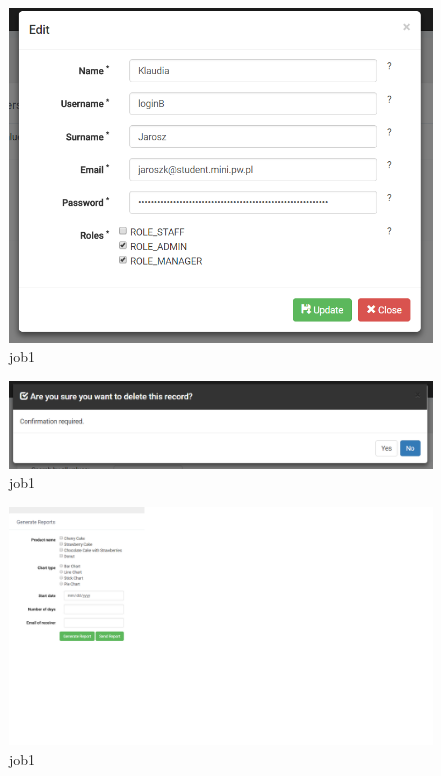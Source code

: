 \documentclass[a4paper,11pt,twoside]{report}
\theoremstyle{definition}
\begin{document}
\begin{figure}[h!]
\begin{center}
\includegraphics[width=\textwidth]{AS/users/4}
\end{center}
\caption{job1}
\end{figure}
\thispagestyle{empty}


\begin{figure}[h!]
\begin{center}
\includegraphics[width=\textwidth]{AS/users/5}
\end{center}
\caption{job1}
\end{figure}
\thispagestyle{empty}


\begin{figure}[h!]
\begin{center}
\includegraphics[width=\textwidth]{AS/report/1}
\end{center}
\caption{job1}
\end{figure}
\thispagestyle{empty}
\end{document}
